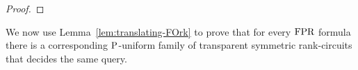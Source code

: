\documentclass[../paper.tex]{subfiles}
\begin{document}
\begin{proof}






\end{proof}

We now use Lemma~\ref{lem:translating-FOrk} to prove that for every $\text{\upshape FPR}$
formula there is a corresponding $\mathrm{P}$-uniform family of transparent symmetric
rank-circuits that decides the same query.
\end{document}
